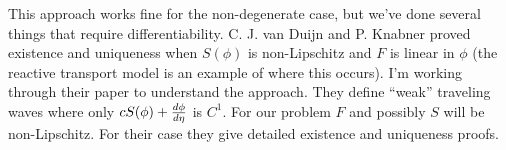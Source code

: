 \documentclass[10pt,dvips,twoside,reqno]{amsart}
\begin{document}
This approach works fine for the non-degenerate case, but we've done
several things that require differentiability. C. J. van Duijn and P.
Knabner proved existence and uniqueness when $S(\phi)$ is
non-Lipschitz and $F$ is linear in $\phi$ (the reactive transport
model is an example of where this occurs). I'm working through their
paper to understand the approach. They define ``weak'' traveling waves
where only $c S(\phi) + \frac{d {\phi}}{d {\eta}}$ is $C^1$. For our problem $F$
and possibly $S$ will be non-Lipschitz. For their case they give
detailed existence and uniqueness proofs.



\end{document}
